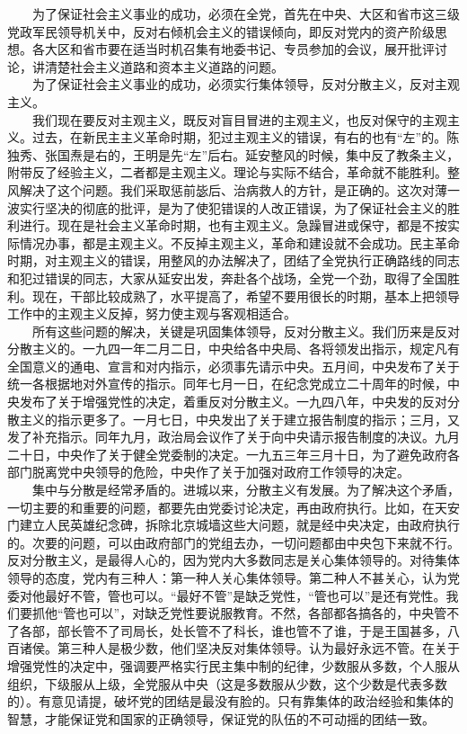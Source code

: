 \documentclass[cn,11pt,chinese]{elegantbook}
\begin{document}
　　为了保证社会主义事业的成功，必须在全党，首先在中央、大区和省市这三级党政军民领导机关中，反对右倾机会主义的错误倾向，即反对党内的资产阶级思想。各大区和省市要在适当时机召集有地委书记、专员参加的会议，展开批评讨论，讲清楚社会主义道路和资本主义道路的问题。\\
　　为了保证社会主义事业的成功，必须实行集体领导，反对分散主义，反对主观主义。\\
　　我们现在要反对主观主义，既反对盲目冒进的主观主义，也反对保守的主观主义。过去，在新民主主义革命时期，犯过主观主义的错误，有右的也有“左”的。陈独秀、张国焘是右的，王明是先“左”后右。延安整风的时候，集中反了教条主义，附带反了经验主义，二者都是主观主义。理论与实际不结合，革命就不能胜利。整风解决了这个问题。我们采取惩前毖后、治病救人的方针，是正确的。这次对薄一波实行坚决的彻底的批评，是为了使犯错误的人改正错误，为了保证社会主义的胜利进行。现在是社会主义革命时期，也有主观主义。急躁冒进或保守，都是不按实际情况办事，都是主观主义。不反掉主观主义，革命和建设就不会成功。民主革命时期，对主观主义的错误，用整风的办法解决了，团结了全党执行正确路线的同志和犯过错误的同志，大家从延安出发，奔赴各个战场，全党一个劲，取得了全国胜利。现在，干部比较成熟了，水平提高了，希望不要用很长的时期，基本上把领导工作中的主观主义反掉，努力使主观与客观相适合。\\
　　所有这些问题的解决，关键是巩固集体领导，反对分散主义。我们历来是反对分散主义的。一九四一年二月二日，中央给各中央局、各将领发出指示，规定凡有全国意义的通电、宣言和对内指示，必须事先请示中央。五月间，中央发布了关于统一各根据地对外宣传的指示。同年七月一日，在纪念党成立二十周年的时候，中央发布了关于增强党性的决定，着重反对分散主义。一九四八年，中央发的反对分散主义的指示更多了。一月七日，中央发出了关于建立报告制度的指示；三月，又发了补充指示。同年九月，政治局会议作了关于向中央请示报告制度的决议。九月二十日，中央作了关于健全党委制的决定。一九五三年三月十日，为了避免政府各部门脱离党中央领导的危险，中央作了关于加强对政府工作领导的决定。\\
　　集中与分散是经常矛盾的。进城以来，分散主义有发展。为了解决这个矛盾，一切主要的和重要的问题，都要先由党委讨论决定，再由政府执行。比如，在天安门建立人民英雄纪念碑，拆除北京城墙这些大问题，就是经中央决定，由政府执行的。次要的问题，可以由政府部门的党组去办，一切问题都由中央包下来就不行。反对分散主义，是最得人心的，因为党内大多数同志是关心集体领导的。对待集体领导的态度，党内有三种人：第一种人关心集体领导。第二种人不甚关心，认为党委对他最好不管，管也可以。“最好不管”是缺乏党性，“管也可以”是还有党性。我们要抓他“管也可以”，对缺乏党性要说服教育。不然，各部都各搞各的，中央管不了各部，部长管不了司局长，处长管不了科长，谁也管不了谁，于是王国甚多，八百诸侯。第三种人是极少数，他们坚决反对集体领导。认为最好永远不管。在关于增强党性的决定中，强调要严格实行民主集中制的纪律，少数服从多数，个人服从组织，下级服从上级，全党服从中央（这是多数服从少数，这个少数是代表多数的）。有意见请提，破坏党的团结是最没有脸的。只有靠集体的政治经验和集体的智慧，才能保证党和国家的正确领导，保证党的队伍的不可动摇的团结一致。\\
\end{document}
